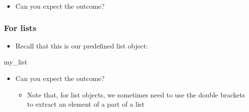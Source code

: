 \documentclass[
]{book}
\newenvironment{Shaded}{\begin{snugshade}}{\end{snugshade}}
\newcommand{\DecValTok}[1]{\textcolor[rgb]{0.00,0.00,0.81}{#1}}
\newcommand{\NormalTok}[1]{#1}
\newcommand{\SpecialCharTok}[1]{\textcolor[rgb]{0.81,0.36,0.00}{\textbf{#1}}}
\providecommand{\tightlist}{%
  \setlength{\itemsep}{0pt}\setlength{\parskip}{0pt}}
\begin{document}
\begin{itemize}
\tightlist
\item
  Can you expect the outcome?
\end{itemize}

\begin{Shaded}
\end{Shaded}

\subsubsection{For lists}\label{for-lists}

\begin{itemize}
\tightlist
\item
  Recall that this is our predefined list object:
\end{itemize}

\begin{Shaded}
\begin{Highlighting}[]
\NormalTok{my\_list}
\end{Highlighting}
\end{Shaded}

\begin{itemize}
\tightlist
\item
  Can you expect the outcome?

  \begin{itemize}
  \tightlist
  \item
    Note that, for list objects, we sometimes need to use the double brackets to extract an element of a part of a list
  \end{itemize}
\end{itemize}

\begin{Shaded}
\end{Shaded}
\end{document}
